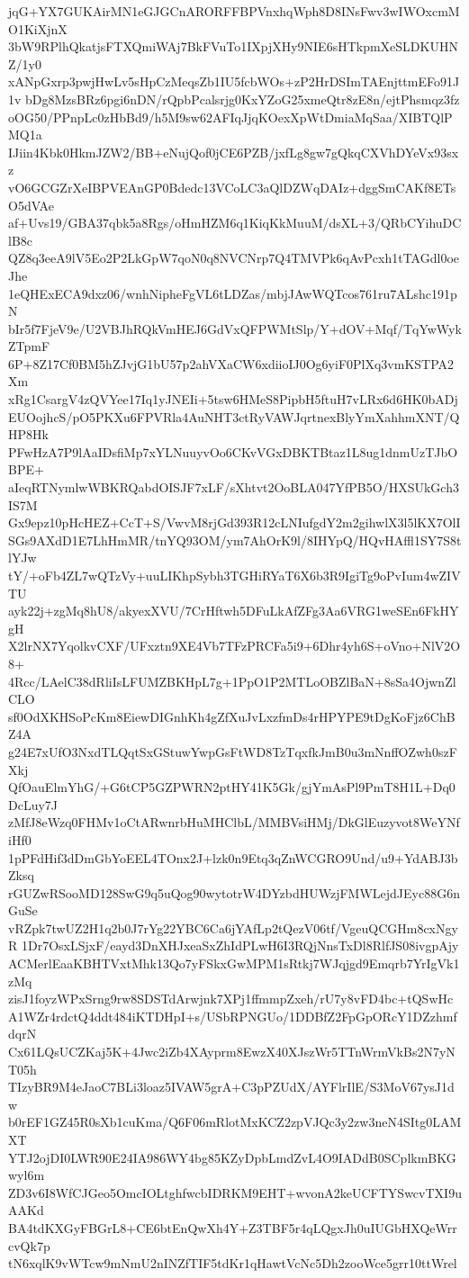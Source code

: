 jqG+YX7GUKAirMN1eGJGCnARORFFBPVnxhqWph8D8INsFwv3wIWOxcmMO1KiXjnX
3bW9RPlhQkatjsFTXQmiWAj7BkFVuTo1IXpjXHy9NIE6sHTkpmXeSLDKUHNZ/1y0
xANpGxrp3pwjHwLv5sHpCzMeqsZb1IU5fcbWOs+zP2HrDSImTAEnjttmEFo91J1v
bDg8MzsBRz6pgi6nDN/rQpbPcalsrjg0KxYZoG25xmeQtr8zE8n/ejtPhsmqz3fz
oOG50/PPnpLc0zHbBd9/h5M9sw62AFIqJjqKOexXpWtDmiaMqSaa/XIBTQlPMQ1a
IJiin4Kbk0HkmJZW2/BB+eNujQof0jCE6PZB/jxfLg8gw7gQkqCXVhDYeVx93sxz
vO6GCGZrXeIBPVEAnGP0Bdedc13VCoLC3aQlDZWqDAIz+dggSmCAKf8ETsO5dVAe
af+Uvs19/GBA37qbk5a8Rgs/oHmHZM6q1KiqKkMuuM/dsXL+3/QRbCYihuDClB8c
QZ8q3eeA9lV5Eo2P2LkGpW7qoN0q8NVCNrp7Q4TMVPk6qAvPcxh1tTAGdl0oeJhe
1eQHExECA9dxz06/wnhNipheFgVL6tLDZas/mbjJAwWQTcos761ru7ALshc191pN
bIr5f7FjeV9e/U2VBJhRQkVmHEJ6GdVxQFPWMtSlp/Y+dOV+Mqf/TqYwWykZTpmF
6P+8Z17Cf0BM5hZJvjG1bU57p2ahVXaCW6xdiioIJ0Og6yiF0PlXq3vmKSTPA2Xm
xRg1CsargV4zQVYee17Iq1yJNEIi+5tsw6HMeS8PipbH5ftuH7vLRx6d6HK0bADj
EUOojhcS/pO5PKXu6FPVRla4AuNHT3ctRyVAWJqrtnexBlyYmXahhmXNT/QHP8Hk
PFwHzA7P9lAaIDsfiMp7xYLNuuyvOo6CKvVGxDBKTBtaz1L8ug1dnmUzTJbOBPE+
aIeqRTNymlwWBKRQabdOISJF7xLF/sXhtvt2OoBLA047YfPB5O/HXSUkGch3IS7M
Gx9epz10pHcHEZ+CcT+S/VwvM8rjGd393R12cLNIufgdY2m2gihwlX3l5lKX7OlI
SGs9AXdD1E7LhHmMR/tnYQ93OM/ym7AhOrK9l/8IHYpQ/HQvHAffl1SY7S8tlYJw
tY/+oFb4ZL7wQTzVy+uuLIKhpSybh3TGHiRYaT6X6b3R9IgiTg9oPvIum4wZIVTU
ayk22j+zgMq8hU8/akyexXVU/7CrHftwh5DFuLkAfZFg3Aa6VRG1weSEn6FkHYgH
X2lrNX7YqolkvCXF/UFxztn9XE4Vb7TFzPRCFa5i9+6Dhr4yh6S+oVno+NlV2O8+
4Rcc/LAelC38dRliIsLFUMZBKHpL7g+1PpO1P2MTLoOBZlBaN+8sSa4OjwnZlCLO
sf0OdXKHSoPcKm8EiewDIGnhKh4gZfXuJvLxzfmDs4rHPYPE9tDgKoFjz6ChBZ4A
g24E7xUfO3NxdTLQqtSxGStuwYwpGsFtWD8TzTqxfkJmB0u3mNnffOZwh0szFXkj
QfOauElmYhG/+G6tCP5GZPWRN2ptHY41K5Gk/gjYmAsPl9PmT8H1L+Dq0DcLuy7J
zMfJ8eWzq0FHMv1oCtARwnrbHuMHClbL/MMBVsiHMj/DkGlEuzyvot8WeYNfiHf0
1pPFdHif3dDmGbYoEEL4TOnx2J+lzk0n9Etq3qZnWCGRO9Und/u9+YdABJ3bZksq
rGUZwRSooMD128SwG9q5uQog90wytotrW4DYzbdHUWzjFMWLejdJEyc88G6nGuSe
vRZpk7twUZ2H1q2b0J7rYg22YBC6Ca6jYAfLp2tQezV06tf/VgeuQCGHm8cxNgyR
1Dr7OsxLSjxF/eayd3DnXHJxeaSxZhIdPLwH6I3RQjNnsTxDl8RlfJS08ivgpAjy
ACMerlEaaKBHTVxtMhk13Qo7yFSkxGwMPM1sRtkj7WJqjgd9Emqrb7YrIgVk1zMq
zisJ1foyzWPxSrng9rw8SDSTdArwjnk7XPj1ffmmpZxeh/rU7y8vFD4bc+tQSwHc
A1WZr4rdctQ4ddt484iKTDHpI+s/USbRPNGUo/1DDBfZ2FpGpORcY1DZzhmfdqrN
Cx61LQsUCZKaj5K+4Jwc2iZb4XAyprm8EwzX40XJszWr5TTnWrmVkBs2N7yNT05h
TIzyBR9M4eJaoC7BLi3loaz5IVAW5grA+C3pPZUdX/AYFlrIlE/S3MoV67ysJ1dw
b0rEF1GZ45R0sXb1cuKma/Q6F06mRlotMxKCZ2zpVJQc3y2zw3neN4SItg0LAMXT
YTJ2ojDI0LWR90E24IA986WY4bg85KZyDpbLmdZvL4O9IADdB0SCplkmBKGwyl6m
ZD3v6I8WfCJGeo5OmcIOLtghfwcbIDRKM9EHT+wvonA2keUCFTYSwcvTXI9uAAKd
BA4tdKXGyFBGrL8+CE6btEnQwXh4Y+Z3TBF5r4qLQgxJh0uIUGbHXQeWrrcvQk7p
tN6xqlK9vWTcw9mNmU2nINZfTIF5tdKr1qHawtVcNc5Dh2zooWce5grr10ttWrel
